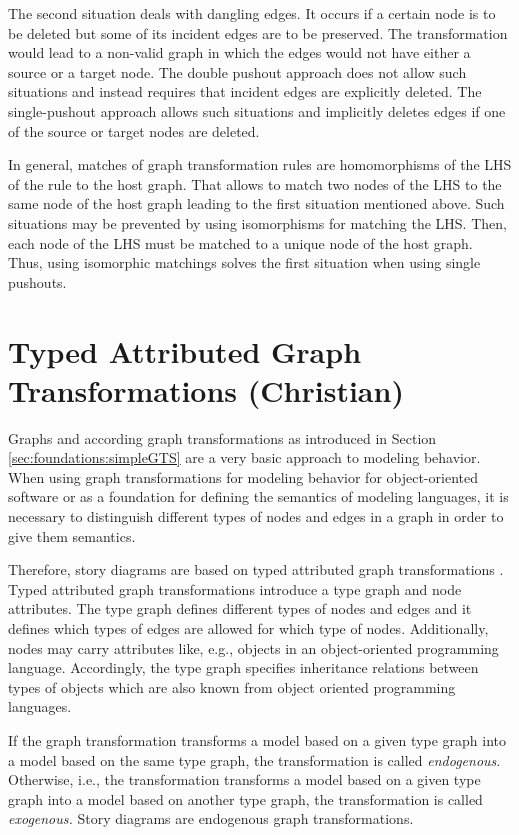 The second situation deals with dangling edges. It occurs if a certain node is
to be deleted but some of its incident edges are to be preserved. The
transformation would lead to a non-valid graph in which the edges would not have
either a source or a target node. The double pushout approach does not allow
such situations and instead requires that incident edges are explicitly
deleted. The single-pushout approach allows such situations and implicitly
deletes edges if one of the source or target nodes are deleted.

In general, matches of graph transformation rules are homomorphisms of the LHS of the rule to the host graph. That allows to match two nodes of the LHS to the same node of the host graph leading to the first situation mentioned above. Such situations may be prevented by using isomorphisms for matching the LHS. Then, each node of the LHS must be matched to a unique node of the host graph. Thus, using isomorphic matchings solves the first situation when using single pushouts.

\section{Typed Attributed Graph Transformations (Christian)}
\label{sec:foundations:typedAttrGTS}

Graphs and according graph transformations as introduced in Section \ref{sec:foundations:simpleGTS} are a very basic approach to modeling behavior. When using graph transformations for modeling behavior for object-oriented software or as a foundation for defining the semantics of modeling languages, it is necessary to distinguish different types of nodes and edges in a graph in order to give them semantics. 

Therefore, story diagrams are based on typed attributed graph transformations \cite{EEPT06}. Typed attributed graph transformations introduce a type graph and node attributes. The type graph defines different types of nodes and edges and it defines which types of edges are allowed for which type of nodes. Additionally, nodes may carry attributes like, e.g., objects in an object-oriented programming language. Accordingly, the type graph specifies inheritance relations between types of objects which are also known from object oriented programming languages.

If the graph transformation transforms a model based on a given type graph into a model based on the same type graph, the transformation is called \emph{endogenous}. Otherwise, i.e., the transformation transforms a model based on a given type graph into a model based on another type graph, the transformation is called \emph{exogenous.} Story diagrams are endogenous graph transformations.

